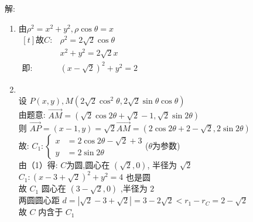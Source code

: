 \documentclass[class=ctexart,crop=false]{standalone}
\begin{document}
解:
\begin{enumerate}[label=(\arabic*)]
	\item
	      由$\rho^2=x^2+y^2,\rho\cos{\theta}=x$\\
	      $\begin{aligned}[t]
			      \text{故}C: & \rho^2=2\sqrt{2}\cos{\theta} \\
			                  & x^2+y^2=2\sqrt{2}x           \\
			      \text{即:}  & (x-\sqrt{2})^2+y^2=2
		      \end{aligned}$
	\item  \quad\\
	      设 $P(x,y),M(2\sqrt{2}\cos^2{\theta},2\sqrt{2}\sin{\theta}\cos{\theta})$\\
	      由题意: $\overrightarrow{AM}=(\sqrt{2}\cos{2\theta}+\sqrt{2}-1,\sqrt{2}\sin{2\theta})$\\
	      则 $\overrightarrow{AP}=(x-1,y)=\sqrt{2}\overrightarrow{AM}=(2\cos{2\theta}+2-\sqrt2,2\sin{2\theta})$\\
	      故: $C_1: \left\{\begin{aligned}
			      x & =2\cos{2\theta}-\sqrt{2}+3 \\
			      y & =2\sin{2\theta}
		      \end{aligned}\right.$($\theta$为参数)\\
	      由（1）得: $C$为圆,圆心在 $(\sqrt{2},0)$, 半径为 $\sqrt{2}$\\
	      $C_1:(x-3+\sqrt{2})^2+y^2=4$ 也是圆\\
	      故 $C_1$ 圆心在 $(3-\sqrt{2},0)$ ,半径为 $2$\\
	      两圆圆心距 $d=|\sqrt{2}-3+\sqrt{2}|=3-2\sqrt{2}<r_1-r_C=2-\sqrt{2}$\\
	      故 $C$ 内含于 $C_1$

\end{enumerate}
\end{document}
